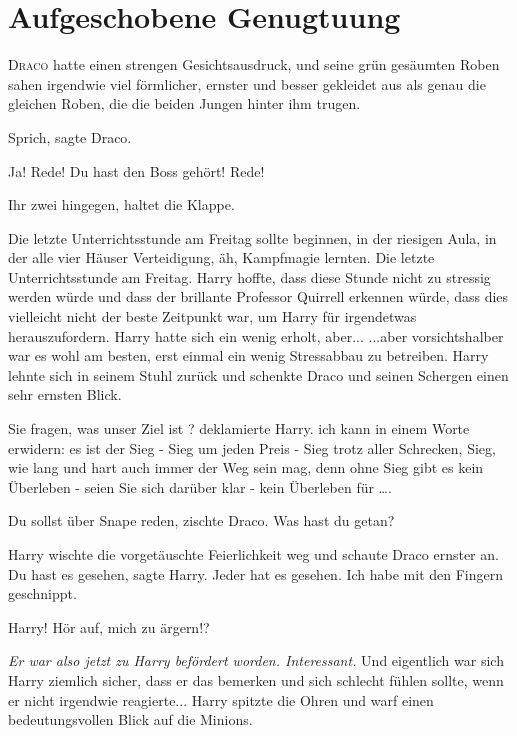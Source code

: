 \chapter{Aufgeschobene Genugtuung}

\lettrine{D}{raco} hatte einen strengen Gesichtsausdruck, und seine grün
gesäumten Roben sahen irgendwie viel förmlicher, ernster und besser gekleidet
aus als genau die gleichen Roben, die die beiden Jungen hinter ihm trugen.

\glqq Sprich\grqq{}, sagte Draco.

\glqq Ja! Rede!\grqq{} \glqq Du hast den Boss gehört! Rede!\grqq{}

\glqq Ihr zwei hingegen, haltet die Klappe.\grqq{}

Die letzte Unterrichtsstunde am Freitag sollte beginnen, in der riesigen Aula,
in der alle vier Häuser Verteidigung, äh, Kampfmagie lernten. Die letzte
Unterrichtsstunde am Freitag. Harry hoffte, dass diese Stunde nicht zu stressig
werden würde und dass der brillante Professor Quirrell erkennen würde, dass dies
vielleicht nicht der beste Zeitpunkt war, um Harry für irgendetwas
herauszufordern. Harry hatte sich ein wenig erholt, aber... ...aber
vorsichtshalber war es wohl am besten, erst einmal ein wenig Stressabbau zu
betreiben. Harry lehnte sich in seinem Stuhl zurück und schenkte Draco und
seinen Schergen einen sehr ernsten Blick.

\glqq Sie fragen, was unser Ziel ist ?\grqq{} deklamierte Harry. \glqq ich kann
in einem Worte erwidern: es ist der Sieg - Sieg um jeden Preis - Sieg trotz
aller Schrecken, Sieg, wie lang und hart auch immer der Weg sein mag, denn ohne
Sieg gibt es kein Überleben - seien Sie sich darüber klar - kein Überleben für
….\grqq{}

\glqq Du sollst über Snape reden\grqq{}, zischte Draco. \glqq Was hast du
getan?\grqq{}

Harry wischte die vorgetäuschte Feierlichkeit weg und schaute Draco ernster an.
\glqq Du hast es gesehen\grqq{}, sagte Harry. \glqq Jeder hat es gesehen. Ich
habe mit den Fingern geschnippt.\grqq{}

\glqq Harry! Hör auf, mich zu ärgern!?\grqq{}

\emph{Er war also jetzt zu Harry befördert worden. Interessant. } Und eigentlich
war sich Harry ziemlich sicher, dass er das bemerken und sich schlecht fühlen
sollte, wenn er nicht irgendwie reagierte... Harry spitzte die Ohren und warf
einen bedeutungsvollen Blick auf die Minions.

